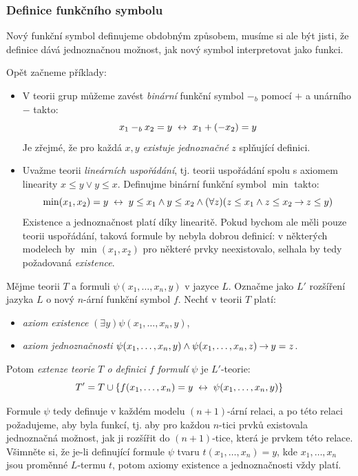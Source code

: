 \subsubsection*{Definice funkčního symbolu}

Nový funkční symbol definujeme obdobným způsobem, musíme si ale být jisti, že definice dává jednoznačnou možnost, jak nový symbol interpretovat jako funkci.

\begin{example}
    Opět začneme příklady:
    \begin{itemize}
        \item V teorii grup můžeme zavést \emph{binární} funkční symbol $-_b$ pomocí $+$ a unárního $-$ takto:
        $$
        x_1 -_b x_2 = y\ \mathbin{\leftrightarrow}\ x_1 + (-x_2) = y
        $$
        Je zřejmé, že pro každá $x,y$ \emph{existuje} \emph{jednoznačné} $z$ splňující definici.        
        \item Uvažme teorii \emph{lineárních uspořádání}, tj. teorii uspořádání spolu s axiomem linearity $x\leq y\lor y\leq x$. Definujme binární funkční symbol $\min$ takto: 
        $$
        \min(x_1,x_2)=y\ \mathbin{\leftrightarrow}\ y\leq x_1\land y\leq x_2\land (\forall z)(z\leq x_1\land z\leq x_2\mathbin{\rightarrow} z\leq y)
        $$
        Existence a jednoznačnost platí díky linearitě. Pokud bychom ale měli pouze teorii uspořádání, taková formule by nebyla dobrou definicí: v některých modelech by $\min(x_1,x_2)$ pro některé prvky neexistovalo, selhala by tedy požadovaná \emph{existence}.
    \end{itemize}
\end{example}

\begin{definition}
    Mějme teorii $T$ a formuli $\psi(x_1,\dots,x_n,y)$ v jazyce $L$. Označme jako $L'$ rozšíření jazyka $L$ o nový $n$-ární funkční symbol $f$. Nechť v teorii $T$ platí:
    \begin{itemize}
        \item \emph{axiom existence} $(\exists y)\psi(x_1,\dots,x_n,y)$, 
        \item \emph{axiom jednoznačnosti} $\psi(x_1,\dots,x_n,y)\land \psi(x_1,\dots,x_n,z)\mathbin{\rightarrow} y=z$.
    \end{itemize}
    Potom \emph{extenze teorie $T$ o definici $f$ formulí $\psi$} je $L'$-teorie: 
    $$T'=T\cup\{f(x_1,\dots,x_n)=y\ \liff\ \psi(x_1,\dots,x_n,y)\}$$
\end{definition}

Formule $\psi$ tedy definuje v každém modelu $(n+1)$-ární relaci, a po této relaci požadujeme, aby byla funkcí, tj. aby pro každou $n$-tici prvků existovala jednoznačná možnost, jak ji rozšířit do $(n+1)$-tice, která je prvkem této relace. Všimněte si, že je-li definující formule $\psi$ tvaru $t(x_1,\dots,x_n)=y$, kde $x_1,\dots,x_n$ jsou proměnné $L$-termu $t$, potom axiomy existence a jednoznačnosti vždy platí.

